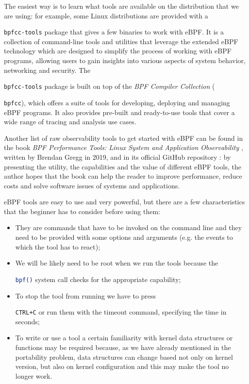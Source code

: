 The easiest way is to learn what tools are available on the distribution that we are using: for example, some Linux distributions are provided with a \raggedright\colorbox{backcolour}{\lstinline[style=commandline, language=bash]|bpfcc-tools|} package that gives a few binaries to work with eBPF.
It is a collection of command-line tools and utilities that leverage the extended eBPF technology which are designed to simplify the process of working with eBPF programs, allowing users to gain insights into various aspects of system behavior, networking and security.
The \raggedright\colorbox{backcolour}{\lstinline[style=commandline, language=bash]|bpfcc-tools|} package is built on top of the \textit{BPF Compiler Collection} (\raggedright\colorbox{backcolour}{\lstinline[style=commandline, language=bash]|bpfcc|}), which offers a suite of tools for developing, deploying and managing eBPF programs. 
It also provides pre-built and ready-to-use tools that cover a wide range of tracing and analysis use cases. 

Another list of raw observability tools to get started with eBPF can be found in the book \textit{BPF Performance Tools: Linux System and Application Observability} \cite{BPFToolsBookWebsite}, written by Brendan Gregg in 2019, and in its official GitHub repository \cite{BPFToolsBookGitHubRepo}: by presenting the utility, the capabilities and the value of different eBPF tools, the author hopes that the book can help the reader to improve performance, reduce costs and solve software issues of systems and applications.

eBPF tools are easy to use and very powerful, but there are a few characteristics that the beginner has to consider before using them:

\begin{itemize}
	\item 
		They are commands that have to be invoked on the command line and they need to be provided with some options and arguments (e.g. the events to which the tool has to react);
	\item 
		We will be likely need to be root when we run the tools because the \raggedright\colorbox{backcolour}{\lstinline[style=commandline, language=bash]|bpf()|} system call checks for the appropriate capability;
	\item 
		To stop the tool from running we have to press \raggedright\colorbox{backcolour}{\lstinline[style=commandline, language=bash]|CTRL+C|} or run them with the timeout command, specifying the time in seconds;
	\item 
		To write or use a tool a certain familiarity with kernel data structures or functions may be required because, as we have already mentioned in the portability problem, data structures can change based not only on kernel version, but also on kernel configuration and this may make the tool no longer work.
\end{itemize}

